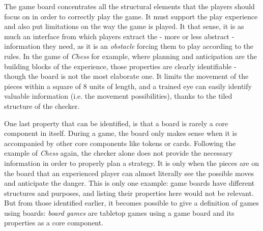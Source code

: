 The game board concentrates all the structural elements that the players should focus on in order to correctly play the game. It must support the play experience and also put limitations on the way the game is played. It that sense, it is as much an interface from which players extract the - more or less abstract - information they need, as it is an \textit{obstacle} forcing them to play according to the rules. In the game of \textit{Chess} for example, where planning and anticipation are the building blocks of the experience, those properties are clearly identifiable - though the board is not the most elaborate one. It limits the movement of the pieces within a square of 8 units of length, and a trained eye can easily identify valuable information (i.e. the movement possibilities), thanks to the tiled structure of the checker. 

One last property that can be identified, is that a board is rarely a core component in itself. During a game, the board only makes sense when it is accompanied by other core components like tokens or cards. Following the example of  \textit{Chess} again, the checker alone does not provide the necessary information in order to properly plan a strategy. It is only when the pieces are on the board that an experienced player can almost literally see the possible moves and anticipate the danger. This is only one example: game boards have different structures and purposes, and listing their properties here would not be relevant. But from those identified earlier, it becomes possible to give a definition of games using boards: \textit{board games} are tabletop games using a game board and its properties as a core component.
